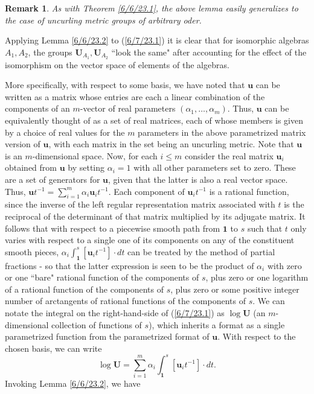 \documentclass{amsart}
\numberwithin{equation}{section}
\newtheorem{remark}[theorem]{Remark}
\theoremstyle{definition}
\numberwithin{theorem}{section}
\begin{document}
\begin{remark} {\rm As with Theorem \ref{6/6/23.1}, the above lemma easily generalizes to the case of uncurling metric groups of arbitrary oder.}\end{remark}

Applying Lemma \ref{6/6/23.2} to (\ref{6/7/23.1}) it is clear that for isomorphic algebras $A_1,A_2$, the groups $\mathbf{U}_{A_1},  \mathbf{U}_{A_2}$ ``look the same" after accounting for the effect of the isomorphism on the vector space of elements of the algebras.

More specifically, with respect to some basis, we have noted that $\mathbf{u}$ can be written as a matrix whose entries are each a linear combination of the components of an $m$-vector of real parameters $(\alpha_1, \dots, \alpha_m)$.   Thus, $\mathbf{u}$ can be equivalently thought of as a set of real matrices, each of whose members is given by a choice of real values for the $m$ parameters in the above parametrized matrix version of $\mathbf{u}$, with each matrix in the set being an uncurling metric.   Note that $\mathbf{u}$ is an $m$-dimensional space.    Now, for each $i\le m$ consider the real matrix  $\mathbf{u}_i$ obtained from $\mathbf{u}$ by setting $\alpha_i =1$ with all other parameters set to zero.  These are a set of generators for $\mathbf{u}$, given that the latter is also a real vector space. Thus, $\mathbf{u}t^{-1} = \sum_{i=1}^m \alpha_i \mathbf{u}_i t^{-1}$.   Each component of $\mathbf{u}_i t^{-1}$ is a rational function, since the inverse of the left regular representation matrix associated with $t$ is the reciprocal of the determinant of that matrix multiplied by its adjugate matrix.  It follows that  with respect to a piecewise smooth path from $\mathbf{1}$ to $s$ such that $t$ only varies with respect to a single one of its components on any of the constituent smooth pieces, $\alpha_i \int_{\mathbf{1}}^s [\mathbf{u}_i t^{-1}]\cdot dt$ can be treated by the method of partial fractions - so that the latter expression is seen to be the product of $\alpha_i$ with zero or one ``bare" rational function of the components of $s$, plus zero or one logarithm of a rational function of the components of $s$, plus zero or some positive integer number of arctangents of rational functions of the components of $s$.  We can notate the integral on the right-hand-side of (\ref{6/7/23.1}) as $\log  \mathbf{U}$ (an $m$-dimensional collection of functions of $s$), which inherits a format as a single parametrized function from the parametrized format of $\mathbf{u}$.   With respect to the chosen basis, we can write \begin{equation}\label{9/26/23.1} \log  \mathbf{U} =\sum_{i=1}^m \alpha_i \int_{\mathbf{1}}^s [\mathbf{u}_i t^{-1}]\cdot dt.\end{equation}   Invoking Lemma \ref{6/6/23.2}, we have   
\end{document}
